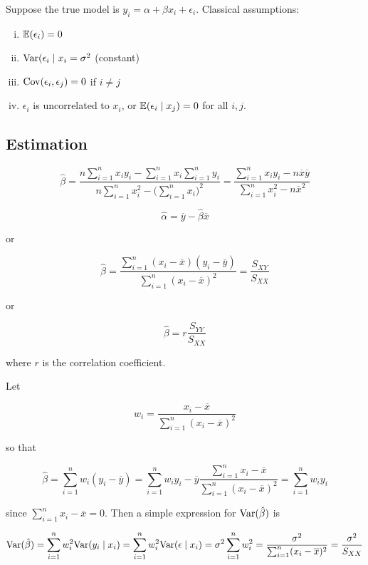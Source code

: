 Suppose the true model is \(y_i = \alpha + \beta x_i + \epsilon_i\). Classical assumptions:

\begin{enumerate}[(i)]

\item \(\mathbb{E}(\epsilon_i)= 0\)

\item \(\mathrm{Var}(\epsilon_i \mid x_i = \sigma^2\) (constant)

\item \(\mathrm{Cov}(\epsilon_i, \epsilon_j) = 0 \) if \(i \neq j\)

\item \(\epsilon_i\) is uncorrelated to \(x_i\), or \(\mathbb{E}(\epsilon_i \mid x_j) = 0 \) for all \(i, j\).

\end{enumerate}

\subsection{Estimation}

\[
\hat{\beta} = \frac{n\sum_{i=1}^n x_i y_i - \sum_{i=1}^n x_i \sum_{i=1}^n y_i}{n \sum_{i=1}^n x_i^2 - \big( \sum_{i=1}^n x_i \big)^2} = \frac{\sum_{i=1}^n x_i y_i - n \overline{x} \overline{y}}{\sum_{i=1}^n x_i^2 - n \overline{x}^2}
\]

\[
\hat{\alpha} = \overline{y} - \hat{\beta} \overline{x}
\]

or

\[
\hat{\beta} = \frac{\sum_{i=1}^n (x_i - \overline{x})(y_i - \overline{y})}{\sum_{i=1}^n(x_i - \overline{x})^2} = \frac{S_{XY}}{S_{XX}}
\]

or

\[
\hat{\beta} = r \frac{S_{YY}}{S_{XX}}
\]

where \(r\) is the correlation coefficient.

Let

\[
w_i = \frac{x_i - \overline{x}}{\sum_{i=1}^n (x_i - \overline{x})^2}
\]

so that 

\[
\hat{\beta} = \sum_{i=1}^n w_i( y_i - \overline{y}) = \sum_{i=1}^n w_i y_i  - \overline{y} \frac{  \sum_{i=1}^n x_i - \overline{x}}{\sum_{i=1}^n (x_i - \overline{x})^2} =  \sum_{i=1}^n w_i y_i 
\]

since \(  \sum_{i=1}^n x_i - \overline{x} = 0\). Then a simple expression for \(\mathrm{Var}(\hat{\beta})\) is 

\[
\mathrm{Var}(\hat{\beta}) = \sum_{i=1}^n w_i^2 \mathrm{Var}(y_i \mid x_i) = \sum_{i=1}^n w_i^2 \mathrm{Var}(\epsilon \mid x_i) = \sigma^2 \sum_{i=1}^n w_i^2 = \frac{\sigma^2}{\sum_{i=1}^n (x_i - \overline{x})^2} = \frac{\sigma^2}{S_{XX}}
\]


